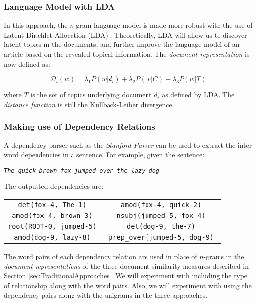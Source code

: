 \documentclass[11pt]{article}
\begin{document}
\subsubsection*{Language Model with LDA}

In this approach, the $n$-gram language model is made more robust with the use of Latent Dirichlet Allocation (LDA) \cite{Blei2003}. Theoretically, LDA will allow us to discover latent topics in the documents, and further improve the language model of an article based on the revealed topical information.  The \emph{document representation} is now defined as: 

\begin{equation}
\mathcal{D}_i(w) = \lambda_1 P(w|d_i) + \lambda_2 P(w| C) + \lambda_3 P(w|T)
\end{equation}

where $T$ is the set of topics underlying document $d_i$ as defined by LDA. The \emph{distance function} is still the Kullback-Leiber divergence. 

\subsubsection{Making use of Dependency Relations} \label{sec:DependencyParsing}

A dependency parser such as the \emph{Stanford Parser} \cite{StanfordParser} can be used to extract the inter word dependencies in a sentence. For example, given the sentence:

\begin{center}
\it \tt  \emph{The quick brown fox jumped over the lazy dog}
\end{center}

The outputted dependencies are:

\begin{center}
\begin{tabular}{cc}
\tt  det(fox-4, The-1) & \tt amod(fox-4, quick-2) \\
\tt amod(fox-4, brown-3) & \tt nsubj(jumped-5, fox-4) \\
\tt root(ROOT-0, jumped-5) & \tt det(dog-9, the-7) \\
\tt amod(dog-9, lazy-8) & \tt prep\_over(jumped-5, dog-9) \\
\end{tabular}
\end{center}

The word pairs of each dependency relation are used in place of $n$-grams in the \emph{document representations} of the three document similarity measures described in Section \ref{sec:TraditionalApproaches}. We will experiment with including the type of relationship along with the word pairs. Also, we will experiment with using the dependency pairs along with the unigrams in the three approaches. 
\end{document}

